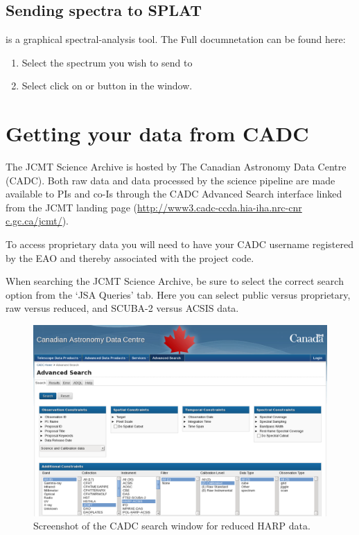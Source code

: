 \documentclass[11pt,oneside,chapters]{starlink}
\providecommand{\splatsun}{\xref{\textbf{SUN/243}}{sun243}{}}
\begin{document}
\section{Sending spectra to SPLAT}

\splat is a graphical spectral-analysis tool.
The Full \splat documnetation can be found here: \splatsun 

\begin{enumerate}[label=(\textbf{\arabic*})]
\item Select the spectrum you wish to send to 

\item Select click on  or  
button in the  window.



\end{enumerate}

\chapter{Getting your data from CADC}
\label{sec:fromcadc}

The JCMT Science Archive is hosted by The Canadian Astronomy Data
Centre (CADC). Both raw data and data processed by the science pipeline
are made available to PIs and co-Is through the CADC Advanced Search
interface linked from the JCMT landing page
(\url{http://www3.cadc-ccda.hia-iha.nrc-cnr c.gc.ca/jcmt/}).

To access proprietary data you will need to have your CADC username
registered by the EAO and thereby associated with the project code.

When searching the JCMT Science Archive, be sure to select the correct
search option from the `JSA Queries' tab. Here you can select public
versus proprietary, raw versus reduced, and SCUBA-2 versus ACSIS data.

\begin{figure}[b!]
\begin{center}
\includegraphics[width=0.98\linewidth]{sc20_cadc}
\caption{\label{fig:cadc}
  Screenshot of the CADC search window for reduced HARP data.}
\end{center}
\end{figure}
\end{document}
